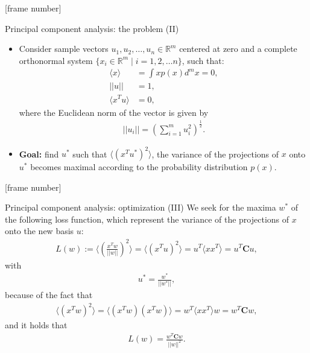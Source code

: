 \documentclass[aspectratio=169,t]{beamer}
\begin{document}
  {
    [frame number]
    \begin{frame}{Principal component analysis: the problem (II)}
    \begin{itemize}
    \item Consider sample vectors $u_1, u_2, \ldots, u_n \in \mathbb{R}^m$ centered at zero and a complete orthonormal system $\{x_i \in \mathbb{R}^m \; \vert \; i = 1, 2, \ldots n\}$, such that:
    \begin{align}
      \langle x \rangle &= \int x p(x) d^m x = 0,\\
      \vert\vert u \vert\vert &= 1,\\
      \langle x^{T}u \rangle &= 0,
    \end{align}
    where the Euclidean norm of the vector is given by
    \begin{align}
      \vert\vert u_i \vert\vert = \left(\sum_{i=1}^{m} u_i^2\right)^\frac{1}{2}.
    \end{align}
      \item \textbf{Goal:} find $u^*$ such that $\langle (x^{T}u^*)^2 \rangle$, the variance of the projections of $x$ onto $u^*$ becomes maximal according to the probability distribution $p(x)$.
    \end{itemize}
    \end{frame}
  }

  {
    [frame number]
    \begin{frame}{Principal component analysis: optimization (III)}
    We seek for the maxima $w^*$ of the following loss function, which represent the variance of the projections of $x$ onto the new basis $u$:
    \begin{align}
      L(w) := \langle (\frac{x^Tw}{\vert\vert w \vert\vert})^2 \rangle = \langle (x^Tu)^2 \rangle = u^T \langle xx^T \rangle = u^T \mathbf{C} u,
    \end{align}
    with
    \begin{align}
      u^* = \frac{w^*}{\vert\vert w^* \vert\vert},
    \end{align}
    because of the fact that
    \begin{align}
      \langle (x^Tw)^2 \rangle = \langle (x^Tw)(x^Tw) \rangle = w^T\langle xx^T \rangle w = w^T \mathbf{C}w,
    \end{align}
    and it holds that
    \begin{align}
      L(w) = \frac{w^T \mathbf{C} w}{\vert\vert w \vert\vert^2}.
    \end{align}
    \end{frame}
  }
\end{document}

